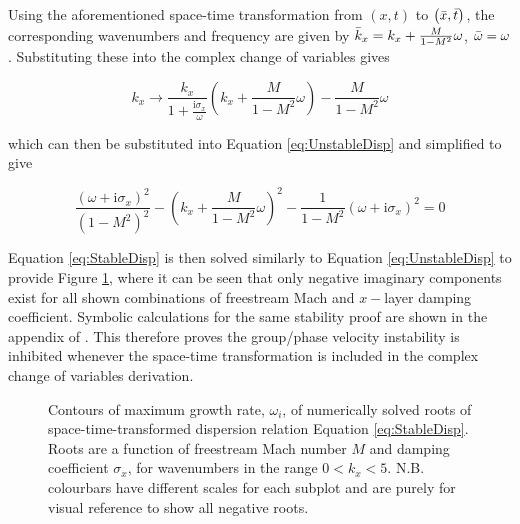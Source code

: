 Using the aforementioned space-time transformation from $\left(x,t\right)$ to $\left(\Bar{x},\Bar{t}\right)$, the corresponding wavenumbers and frequency are given by $\Bar{k}_x = k_x + \frac{M}{1-M^2}\omega$, $\Bar{\omega}=\omega$. Substituting these into the complex change of variables gives

\begin{equation}
    k_x \rightarrow \frac{k_x}{1 + \frac{\mathrm{i} \sigma_x}{\omega}} \left( k_x + \frac{M}{1-M^2}\omega\right) - \frac{M}{1-M^2}\omega
\end{equation}

which can then be substituted into Equation \ref{eq:UnstableDisp} and simplified to give

\begin{equation} \label{eq:StableDisp}
    \frac{\left( \omega + \mathrm{i} \sigma_x \right)^2}{\left(1-M^2\right)^2} - \left(k_x + \frac{M}{1-M^2}\omega\right)^2 - \frac{1}{1-M^2}\left(\omega + \mathrm{i} \sigma_x \right)^2 = 0
\end{equation}

Equation \ref{eq:StableDisp} is then solved similarly to Equation \ref{eq:UnstableDisp} to provide Figure \ref{fig:StableSigmaxM}, where it can be seen that only negative imaginary components exist for all shown combinations of freestream Mach and $x-$layer damping coefficient. Symbolic calculations for the same stability proof are shown in the appendix of \cite{hu2001astablePML}. This therefore proves the group/phase velocity instability is inhibited whenever the space-time transformation is included in the complex change of variables derivation.


\begin{figure}[h!]
\centering
{}
\caption{Contours of maximum growth rate, $\omega_{i}$, of numerically solved roots of space-time-transformed dispersion relation Equation \ref{eq:StableDisp}. Roots are a function of freestream Mach number $M$ and damping coefficient $\sigma_x$, for wavenumbers in the range $0 < k_{x} < 5$. N.B. colourbars have different scales for each subplot and are purely for visual reference to show all negative roots.}
\label{fig:StableSigmaxM}
\end{figure}


